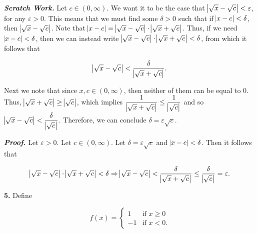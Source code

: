 \documentclass[12pt, a4paper]{article}
\begin{document}
\begin{description}

    \item\textit{\textbf{Scratch Work.} } Let $c\in(0,\infty)$. We want it to be the case that $\abs{\sqrt{x}-\sqrt{c}}<\varepsilon$, for any $\varepsilon>0$. This means that we must find some $\delta>0$ such that if $\abs{x-c}<\delta$, then $\abs{\sqrt{x}-\sqrt{c}}$. Note that $\abs{x-c}=\abs{\sqrt{x}-\sqrt{c}}\cdot\abs{\sqrt{x}+\sqrt{c}}$. Thus, if we need $\abs{x-c}<\delta$, then we can instead write $\abs{\sqrt{x}-\sqrt{c}}\cdot\abs{\sqrt{x}+\sqrt{c}}<\delta$, from which it follows that
    
    \begin{equation*}
        \abs{\sqrt{x}-\sqrt{c}}<\frac{\delta}{\abs{\sqrt{x}+\sqrt{c}}}.
    \end{equation*}
    
    Next we note that since $x,c\in(0,\infty)$, then neither of them can be equal to 0. Thus, $\abs{\sqrt{x}+\sqrt{c}}\geq\abs{\sqrt{c}}$, which implies $\mathlarger{\frac{1}{\abs{\sqrt{x}+\sqrt{c}}}\leq\frac{1}{\abs{\sqrt{c}}}}$ and so $\abs{\sqrt{x}-\sqrt{c}}<\mathlarger{\frac{\delta}{\abs{\sqrt{c}}}}$. Therefore, we can conclude $\delta=\varepsilon\sqrt{c}$.
    
    \item\textit{\textbf{Proof.} } Let $\varepsilon>0$. Let $c\in(0,\infty)$. Let $\delta=\varepsilon\sqrt{c}$ and $\abs{x-c}<\delta$. Then it follows that 
    
    \begin{equation*}
        \abs{\sqrt{x}-\sqrt{c}}\cdot\abs{\sqrt{x}+\sqrt{c}}<\delta\Rightarrow\abs{\sqrt{x}-\sqrt{c}}<\frac{\delta}{\abs{\sqrt{x}+\sqrt{c}}}\leq\frac{\delta}{\abs{\sqrt{c}}}=\varepsilon.
    \end{equation*}
    
    \hspace{150mm}\square  
    
\end{description}

\newpage

\noindent\textbf{5. } Define

\begin{equation*}
    f(x)=\left\{\begin{array}{rcl}1 & \text{if }x\geq 0 \\ -1 & \text{if }x<0.\end{array}\right.
\end{equation*}
\end{document}
